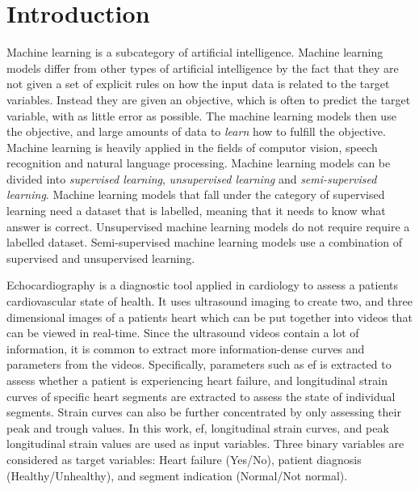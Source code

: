 \chapter{Introduction} \label{chap:intro}

Machine learning is a subcategory of artificial intelligence. Machine learning models differ from other types of artificial intelligence by the fact that they are not given a set of explicit rules on how the input data is related to the target variables. Instead they are given an objective, which is often to predict the target variable, with as little error as possible. The machine learning models then use the objective, and large amounts of data to \textit{learn} how to fulfill the objective. Machine learning is heavily applied in the fields of computor vision, speech recognition and natural language processing. Machine learning models can be divided into \textit{supervised learning}, \textit{unsupervised learning} and \textit{semi-supervised learning}. Machine learning models that fall under the category of supervised learning need a dataset that is labelled, meaning that it needs to know what answer is correct. Unsupervised machine learning models do not require require a labelled dataset. Semi-supervised machine learning models use a combination of supervised and unsupervised learning. \bigskip

Echocardiography is a diagnostic tool applied in cardiology to assess a patients cardiovascular state of health. It uses ultrasound imaging to create two, and three dimensional images of a patients heart which can be put together into videos that can be viewed in real-time. Since the ultrasound videos contain a lot of information, it is common to extract more information-dense curves and parameters from the videos. Specifically, parameters such as \acrfull{ef} is extracted to assess whether a patient is experiencing heart failure, and longitudinal strain curves of specific heart segments are extracted to assess the state of individual segments. Strain curves can also be further concentrated by only assessing their peak and trough values. In this work, \acrshort{ef}, longitudinal strain curves, and peak longitudinal strain values are used as input variables. Three binary variables are considered as target variables: Heart failure (Yes/No), patient diagnosis (Healthy/Unhealthy), and segment indication (Normal/Not normal).

